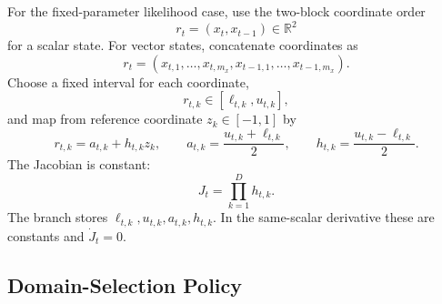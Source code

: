 \documentclass[11pt]{article}
\numberwithin{equation}{section}
\newcommand{\R}{\mathbb R}
\begin{document}
For the fixed-parameter likelihood case, use the two-block coordinate order
\[
    r_t=(x_t,x_{t-1})\in\R^2
\]
for a scalar state.  For vector states, concatenate coordinates as
\[
    r_t=(x_{t,1},\ldots,x_{t,m_x},x_{t-1,1},\ldots,x_{t-1,m_x}).
\]
Choose a fixed interval for each coordinate,
\[
    r_{t,k}\in[\ell_{t,k},u_{t,k}],
\]
and map from reference coordinate \(z_k\in[-1,1]\) by
\begin{equation}
    r_{t,k}=a_{t,k}+h_{t,k}z_k,\qquad
    a_{t,k}=\frac{u_{t,k}+\ell_{t,k}}2,\qquad
    h_{t,k}=\frac{u_{t,k}-\ell_{t,k}}2.
    \label{eq:p24-c1}
\end{equation}
The Jacobian is constant:
\begin{equation}
    J_t=\prod_{k=1}^{D}h_{t,k}.
    \label{eq:p24-c2}
\end{equation}
The branch stores \(\ell_{t,k},u_{t,k},a_{t,k},h_{t,k}\).  In the same-scalar
derivative these are constants and \(\dot J_t=0\).

\subsection*{Domain-Selection Policy}
\end{document}

